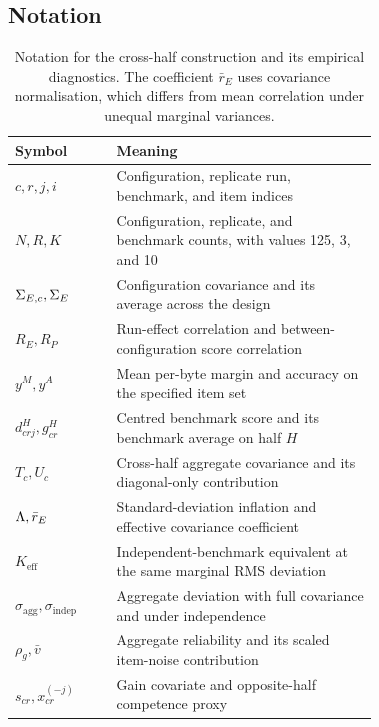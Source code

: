 \subsection{Notation}
\begin{table}[h]
\centering
\caption{Notation for the cross-half construction and its empirical diagnostics. The coefficient $\bar r_E$ uses covariance normalisation, which differs from mean correlation under unequal marginal variances.}
\begin{tabular}{lp{0.72\linewidth}}
\toprule
Symbol & Meaning\\
\midrule
$c,r,j,i$ & Configuration, replicate run, benchmark, and item indices\\
$N,R,K$ & Configuration, replicate, and benchmark counts, with values 125, 3, and 10\\
$\Sigma_{E,c},\Sigma_E$ & Configuration covariance and its average across the design\\
$R_E,R_P$ & Run-effect correlation and between-configuration score correlation\\
$y^M,y^A$ & Mean per-byte margin and accuracy on the specified item set\\
$d^H_{crj},g^H_{cr}$ & Centred benchmark score and its benchmark average on half $H$\\
$T_c,U_c$ & Cross-half aggregate covariance and its diagonal-only contribution\\
$\Lambda,\bar r_E$ & Standard-deviation inflation and effective covariance coefficient\\
$K_{\mathrm{eff}}$ & Independent-benchmark equivalent at the same marginal RMS deviation\\
$\sigma_{\mathrm{agg}},\sigma_{\mathrm{indep}}$ & Aggregate deviation with full covariance and under independence\\
$\rho_g,\bar v$ & Aggregate reliability and its scaled item-noise contribution\\
$s_{cr},x_{cr}^{(-j)}$ & Gain covariate and opposite-half competence proxy\\
\bottomrule
\end{tabular}
\end{table}

